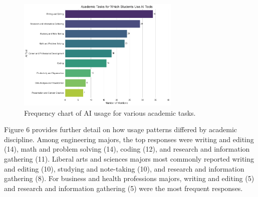\documentclass[12pt]{article}
\begin{document}
\begin{figure}[htbp]
  \centering
  \includegraphics[width=0.69\textwidth]{fig5.png} %
  \caption{Frequency chart of AI usage for various academic tasks.}
  \label{fig:example1}
\end{figure}

Figure 6 provides further detail on how usage patterns differed by academic discipline. Among engineering majors, the top responses were writing and editing (14), math and problem solving (14), coding (12), and research and information gathering (11). Liberal arts and sciences majors most commonly reported writing and editing (10), studying and note-taking (10), and research and information gathering (8). For business and health professions majors, writing and editing (5) and research and information gathering (5) were the most frequent responses.
\end{document}
